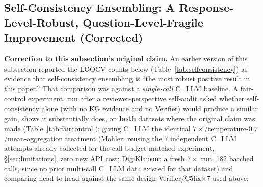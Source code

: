 \documentclass[conference]{IEEEtran}
\begin{document}
\subsection{Self-Consistency Ensembling: A Response-Level-Robust, Question-Level-Fragile Improvement (Corrected)}
\label{subsec:selfconsistency}

\textbf{Correction to this subsection's original claim.} An earlier
version of this subsection reported the LOOCV counts below
(Table~\ref{tab:selfconsistency}) as evidence that self-consistency
ensembling is ``the most robust positive result in this paper.'' That
comparison was against a \emph{single-call} C\_LLM baseline. A
fair-control experiment, run after a reviewer-perspective self-audit
asked whether self-consistency alone (with no KG evidence and no
Verifier) would produce a similar gain, shows it substantially does, on
\textbf{both} datasets where the original claim was made
(Table~\ref{tab:faircontrol}): giving C\_LLM the identical
$7\times$/temperature-$0.7$/mean-aggregation treatment (Mohler: reusing
the 7 independent C\_LLM attempts already collected for the
call-budget-matched experiment, \S\ref{sec:limitations}, zero new API
cost; DigiKlausur: a fresh $7\times$ run, 182 batched calls, since no
prior multi-call C\_LLM data existed for that dataset) and comparing
head-to-head against the same-design Verifier/C5fix$\times7$ used
above:

\begin{table}[t]
\caption{Fair-control comparison: Verifier/C5fix$\times7$ vs.\ an
equally-resourced C\_LLM$\times7$ (same $K$, temperature, aggregation),
in place of the single-call baseline used in Table~\ref{tab:selfconsistency}.}
\label{tab:faircontrol}
\centering
\footnotesize
\setlength{\tabcolsep}{3pt}
\end{table}
\end{document}
